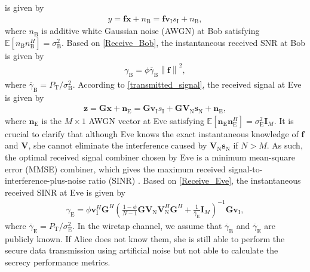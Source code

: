 \documentclass[journal]{IEEEtran}
\begin{document}
is given by
\begin{align}\label{Receive_Bob}
y=\mathbf{f}\mathbf{x}+n_{\textrm{B}}=\mathbf{f}\textbf{v}_{\textrm{I}}s_{\textrm{I}}+n_{\textrm{B}},
\end{align}
where $n_{\textrm{B}}$ is additive white Gaussian noise (AWGN) at
Bob satisfying
$\mathbb{E}\left[n_{\textrm{B}}n_{\textrm{B}}^{H}\right]=\sigma_{\textrm{B}}^{2}$.
Based on \eqref{Receive_Bob}, the instantaneous received SNR at Bob
is given by
\begin{align}\label{SNR_Bob}
\gamma_{\textrm{B}}=\phi\overline\gamma_{\textrm{B}}\left\|\mathbf{f}\right\|^{2},
\end{align}
where
$\overline\gamma_{\textrm{B}}=P_{\textrm{T}}/\sigma_{\textrm{B}}^{2}$.
According to \eqref{transmitted_signal}, the received signal at Eve
is given by
\begin{align}\label{Receive_Eve}
\mathbf{z}=\mathbf{G}\mathbf{x}+\mathbf{n}_{\textrm{E}}
=\mathbf{G}\textbf{v}_{\textrm{I}}s_{\textrm{I}}+
\mathbf{G}\textbf{V}_{\textrm{N}}\mathbf{s}_{\textrm{N}}+\mathbf{n}_{\textrm{E}},
\end{align}
where $\mathbf{n}_{\textrm{E}}$ is the $M\times{1}$ AWGN vector at
Eve satisfying
$\mathbb{E}\left[\textbf{n}_{\textrm{E}}\textbf{n}_{\textrm{E}}^{H}\right]
=\sigma_{\textrm{E}}^{2}\textbf{I}_{M}$. It is crucial to clarify
that although Eve knows the exact instantaneous knowledge of
$\mathbf{f}$ and $\mathbf{V}$, she cannot eliminate the interference
caused by $\textbf{V}_{\textrm{N}}\mathbf{s}_{\textrm{N}}$ if $N>M$.
As such, the optimal received signal combiner chosen by Eve is a
minimum mean-square error (MMSE) combiner, which gives the maximum
received signal-to-interference-plus-noise ratio (SINR) \cite{Gao}.
Based on \eqref{Receive_Eve}, the instantaneous received SINR at Eve
is given by
\begin{align}\label{SNR_Eve}
\gamma_{\textrm{E}}=\phi\textbf{v}_{\textrm{I}}^{H}\mathbf{G}^{H}\left(\frac{1-\phi}{N-1}\mathbf{G}\textbf{V}_{\textrm{N}}\textbf{V}_{\textrm{N}}^{H}\mathbf{G}^{H}+\frac{1}{\overline\gamma_{\textrm{E}}}\mathbf{I}_{M}\right)^{-1}\mathbf{G}\textbf{v}_{\textrm{I}},
\end{align}
where
$\overline\gamma_{\textrm{E}}=P_{\textrm{T}}/\sigma_{\textrm{E}}^{2}$.
In the wiretap channel, we assume that
$\overline\gamma_{\textrm{B}}$ and $\overline\gamma_{\textrm{E}}$
are publicly known. If Alice does not know them, she is still able
to perform the secure data transmission using artificial noise but
not able to calculate the secrecy performance metrics.
\end{document}
